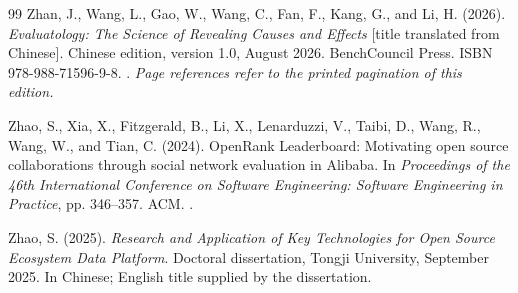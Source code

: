 \begin{thebibliography}{99}
Zhan, J., Wang, L., Gao, W., Wang, C., Fan, F., Kang, G., and Li, H. (2026).
\emph{Evaluatology: The Science of Revealing Causes and Effects} [title translated from Chinese].
Chinese edition, version 1.0, August 2026. BenchCouncil Press.
ISBN 978-988-71596-9-8. .
\emph{Page references refer to the printed pagination of this edition.}

Zhao, S., Xia, X., Fitzgerald, B., Li, X., Lenarduzzi, V., Taibi, D., Wang, R., Wang, W., and Tian, C. (2024).
OpenRank Leaderboard: Motivating open source collaborations through social network evaluation in Alibaba.
In \emph{Proceedings of the 46th International Conference on Software Engineering: Software Engineering in Practice}, pp. 346--357. ACM.
.

Zhao, S. (2025).
\emph{Research and Application of Key Technologies for Open Source Ecosystem Data Platform}.
Doctoral dissertation, Tongji University, September 2025. In Chinese; English title supplied by the dissertation.
\end{thebibliography}
\endgroup
